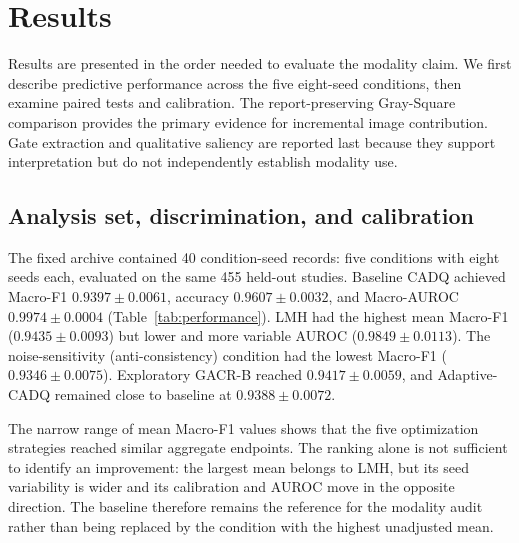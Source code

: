 \documentclass[10pt,a4paper,twocolumn]{article}
\begin{document}
\section{Results}\label{sec:results}

Results are presented in the order needed to evaluate the modality claim. We
first describe predictive performance across the five eight-seed conditions,
then examine paired tests and calibration. The report-preserving Gray-Square
comparison provides the primary evidence for incremental image contribution.
Gate extraction and qualitative saliency are reported last because they support
interpretation but do not independently establish modality use.

\subsection{Analysis set, discrimination, and calibration}\label{sec:performance}

The fixed archive contained 40 condition-seed records: five conditions with
eight seeds each, evaluated on the same 455 held-out studies. Baseline CADQ
achieved Macro-F1 $0.9397\pm0.0061$, accuracy $0.9607\pm0.0032$, and
Macro-AUROC $0.9974\pm0.0004$ (Table~\ref{tab:performance}). LMH had the
highest mean Macro-F1 ($0.9435\pm0.0093$) but lower and more variable AUROC
($0.9849\pm0.0113$). The noise-sensitivity (anti-consistency) condition had
the lowest Macro-F1 ($0.9346\pm0.0075$). Exploratory GACR-B reached
$0.9417\pm0.0059$, and
Adaptive-CADQ remained close to baseline at $0.9388\pm0.0072$.

The narrow range of mean Macro-F1 values shows that the five optimization
strategies reached similar aggregate endpoints. The ranking alone is not
sufficient to identify an improvement: the largest mean belongs to LMH, but its
seed variability is wider and its calibration and AUROC move in the opposite
direction. The baseline therefore remains the reference for the modality audit
rather than being replaced by the condition with the highest unadjusted mean.
\end{document}
